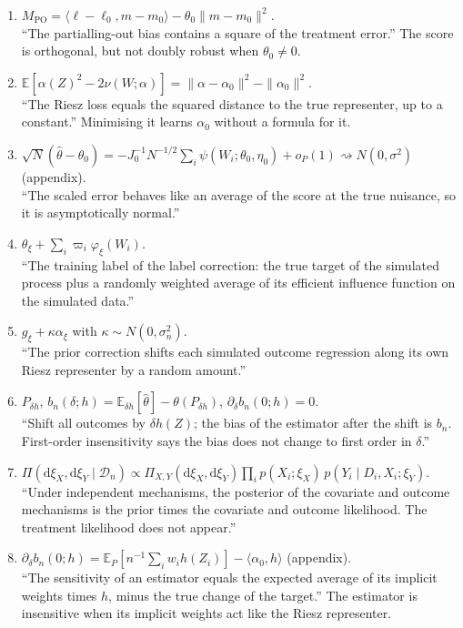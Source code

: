 \documentclass[11pt]{article}
\newcommand{\E}{\mathbb{E}}
\begin{document}
\begin{enumerate}[leftmargin=*,itemsep=4pt]
\item $M_{\mathrm{PO}}=\langle\ell-\ell_0,m-m_0\rangle-\theta_0\|m-m_0\|^2$.\\
``The partialling-out bias contains a square of the treatment error.'' The score is orthogonal, but not doubly robust when $\theta_0\neq0$.

\item $\E[\alpha(Z)^2-2\nu(W;\alpha)]=\|\alpha-\alpha_0\|^2-\|\alpha_0\|^2$.\\
``The Riesz loss equals the squared distance to the true representer, up to a constant.'' Minimising it learns $\alpha_0$ without a formula for it.

\item $\sqrt N(\hat\theta-\theta_0)=-J_0^{-1}N^{-1/2}\sum_i\psi(W_i;\theta_0,\eta_0)+o_P(1)\rightsquigarrow N(0,\sigma^2)$ (appendix).\\
``The scaled error behaves like an average of the score at the true nuisance, so it is asymptotically normal.''

\item $\theta_\xi+\sum_i\varpi_i\varphi_\xi(W_i)$.\\
``The training label of the label correction: the true target of the simulated process plus a randomly weighted average of its efficient influence function on the simulated data.''

\item $g_\xi+\kappa\alpha_\xi$ with $\kappa\sim N(0,\sigma_n^2)$.\\
``The prior correction shifts each simulated outcome regression along its own Riesz representer by a random amount.''

\item $P_{\delta h}$, $b_n(\delta;h)=\E_{\delta h}[\hat\theta]-\theta(P_{\delta h})$, $\partial_\delta b_n(0;h)=0$.\\
``Shift all outcomes by $\delta h(Z)$; the bias of the estimator after the shift is $b_n$. First-order insensitivity says the bias does not change to first order in $\delta$.''

\item $\Pi(\mathrm d\xi_X,\mathrm d\xi_Y\mid\mathcal D_n)\propto\Pi_{X,Y}(\mathrm d\xi_X,\mathrm d\xi_Y)\prod_ip(X_i;\xi_X)\,p(Y_i\mid D_i,X_i;\xi_Y)$.\\
``Under independent mechanisms, the posterior of the covariate and outcome mechanisms is the prior times the covariate and outcome likelihood. The treatment likelihood does not appear.''

\item $\partial_\delta b_n(0;h)=\E_P[n^{-1}\sum_iw_ih(Z_i)]-\langle\alpha_0,h\rangle$ (appendix).\\
``The sensitivity of an estimator equals the expected average of its implicit weights times $h$, minus the true change of the target.'' The estimator is insensitive when its implicit weights act like the Riesz representer.
\end{enumerate}
\end{document}
